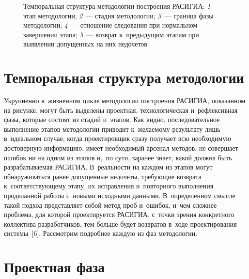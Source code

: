 \begin{multicols}{2}
\begin{figure*}
{\small Темпоральная структура методологии построения РАСИГИА: \textit{1}~--- этап методологии; \textit{2}~--- стадия методологии;
\textit{3}~--- граница фазы методологии; \textit{4}~--- отношение следования при нормальном завершении этапа;  
\textit{5}~--- возврат к~предыдущим этапам при выявлении допущенных на них недочетов}
\end{figure*}

\vspace*{-6pt}
  
\section{Темпоральная структура методологии}

\vspace*{-6pt}

  Укрупненно в~жизненном цикле методологии построения \mbox{РАСИГИА}, 
показанном на рисунке, могут быть выделены проектная, технологическая 
и~рефлексивная фазы, которые со\-сто\-ят из стадий и~этапов. Как видно, 
последовательное выполнение этапов методологии приводит к~же\-ла\-емо\-му 
результату лишь в~идеальном случае, когда проектировщик сразу получает всю 
необходимую достоверную информацию, имеет необходимый арсенал методов, 
не совершает ошибок ни на одном из этапов и,~по сути, заранее знает, какой 
должна быть разрабатываемая \mbox{РАСИГИА}. В~реальности на каждом из 
этапов могут обнаруживаться ранее допущенные недочеты, требующие 
возврата к~соответствующему этапу, их исправления и~повторного выполнения 
проделанной работы с~новыми исходными данными. В~определенном смыс\-ле 
такой подход представляет собой метод проб и~ошибок, и~чем слож\-нее 
проблема, для которой проектируется \mbox{РАСИГИА}, с~точ\-ки зрения 
конкретного коллектива разработчиков, тем больше будет возвратов в~ходе 
проектирования системы~[6]. Рас\-смот\-рим по\-дроб\-нее каждую из фаз 
методологии.



\section{Проектная фаза}


\end{multicols}
